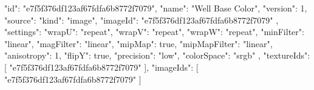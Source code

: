{
  "id": "e7f5f376df123af67fdfa6b8772f7079",
  "name": "Well Base Color",
  "version": 1,
  "source": {
    "kind": "image",
    "imageId": "e7f5f376df123af67fdfa6b8772f7079"
  },
  "settings": {
    "wrapU": "repeat",
    "wrapV": "repeat",
    "wrapW": "repeat",
    "minFilter": "linear",
    "magFilter": "linear",
    "mipMap": true,
    "mipMapFilter": "linear",
    "anisotropy": 1,
    "flipY": true,
    "precision": "low",
    "colorSpace": "srgb"
  },
  "textureIds": [
    "e7f5f376df123af67fdfa6b8772f7079"
  ],
  "imageIds": [
    "e7f5f376df123af67fdfa6b8772f7079"
  ]
}
